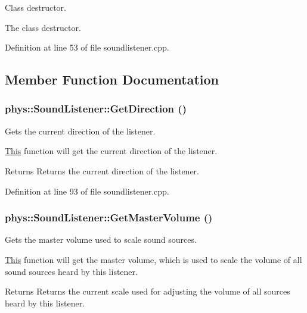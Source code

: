 Class destructor. 

The class destructor. 

Definition at line 53 of file soundlistener.cpp.



\subsection{Member Function Documentation}
\hypertarget{classphys_1_1SoundListener_a5277c24127bd23796710516c21154b49}{
\subsubsection[{GetDirection}]{ phys::SoundListener::GetDirection ()}}
\label{d1/d5a/classphys_1_1SoundListener_a5277c24127bd23796710516c21154b49}


Gets the current direction of the listener. 

\hyperlink{structThis}{This} function will get the current direction of the listener. \begin{DoxyReturn}{Returns}
Returns the current direction of the listener. 
\end{DoxyReturn}


Definition at line 93 of file soundlistener.cpp.

\hypertarget{classphys_1_1SoundListener_a03acbadb9e7ebad0014269bf5c3bcf3d}{
\subsubsection[{GetMasterVolume}]{ phys::SoundListener::GetMasterVolume ()}}
\label{d1/d5a/classphys_1_1SoundListener_a03acbadb9e7ebad0014269bf5c3bcf3d}


Gets the master volume used to scale sound sources. 

\hyperlink{structThis}{This} function will get the master volume, which is used to scale the volume of all sound sources heard by this listener. \begin{DoxyReturn}{Returns}
Returns the current scale used for adjusting the volume of all sources heard by this listener. 
\end{DoxyReturn}


